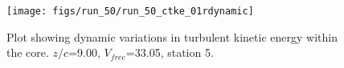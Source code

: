 \begin{figure}[H]
\centering
\texttt{[image: figs/run\_50/run\_50\_ctke\_01rdynamic]}
\caption{Plot showing dynamic variations in turbulent kinetic energy within the core. $z/c$=9.00, $V_{free}$=33.05, station 5.}
\label{fig:run_50_ctke_01rdynamic}
\end{figure}


